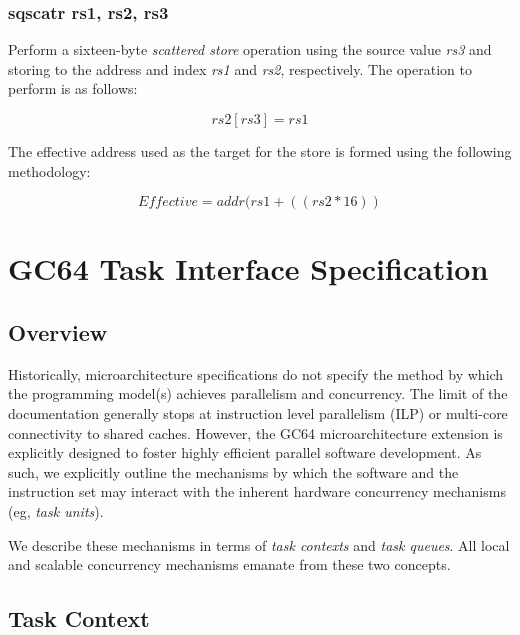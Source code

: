 \documentclass{article}
\begin{document}
\subsubsection{sqscatr rs1, rs2, rs3}

Perform a sixteen-byte \emph{scattered store} operation using the 
source value \emph{rs3} and storing to the address and index
\emph{rs1} and \emph{rs2}, respectively.  The operation to
perform is as follows: 

\begin{equation}
rs2[rs3] = rs1
\end{equation}

The effective address used as the target
for the store is formed using the following methodology:

\begin{equation}
Effective = addr(rs1 + ((rs2 * 16))
\end{equation}

\newpage
\section{GC64 Task Interface Specification}

\subsection{Overview}

Historically, microarchitecture specifications do not specify the method by which
the programming model(s) achieves parallelism and concurrency.  The limit of the
documentation generally stops at instruction level parallelism (ILP) or multi-core
connectivity to shared caches.  However, the GC64 microarchitecture extension is
explicitly designed to foster highly efficient parallel software development.
As such, we explicitly outline the mechanisms by which the software and the
instruction set may interact with the inherent hardware concurrency mechanisms 
(eg, \emph{task units}). 

We describe these mechanisms in terms of \emph{task contexts} and \emph{task queues}.  
All local and scalable concurrency mechanisms emanate from these two concepts.  

\subsection{Task Context}
\end{document}
